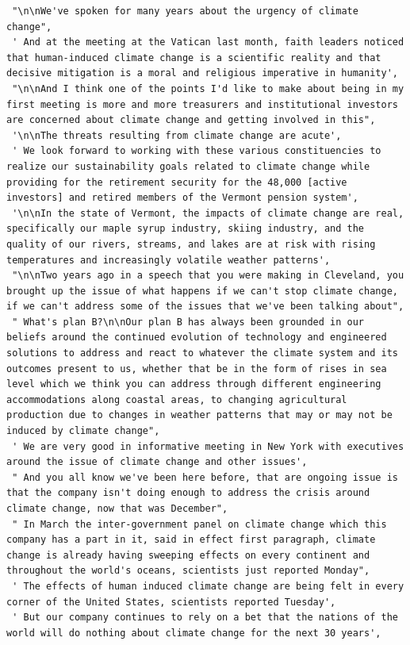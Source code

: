 \documentclass[
  letterpaper,
  DIV=11,
  numbers=noendperiod]{scrreprt}
\begin{document}
\begin{verbatim}
 "\n\nWe've spoken for many years about the urgency of climate change",
 ' And at the meeting at the Vatican last month, faith leaders noticed that human-induced climate change is a scientific reality and that decisive mitigation is a moral and religious imperative in humanity',
 "\n\nAnd I think one of the points I'd like to make about being in my first meeting is more and more treasurers and institutional investors are concerned about climate change and getting involved in this",
 '\n\nThe threats resulting from climate change are acute',
 ' We look forward to working with these various constituencies to realize our sustainability goals related to climate change while providing for the retirement security for the 48,000 [active investors] and retired members of the Vermont pension system',
 '\n\nIn the state of Vermont, the impacts of climate change are real, specifically our maple syrup industry, skiing industry, and the quality of our rivers, streams, and lakes are at risk with rising temperatures and increasingly volatile weather patterns',
 "\n\nTwo years ago in a speech that you were making in Cleveland, you brought up the issue of what happens if we can't stop climate change, if we can't address some of the issues that we've been talking about",
 " What's plan B?\n\nOur plan B has always been grounded in our beliefs around the continued evolution of technology and engineered solutions to address and react to whatever the climate system and its outcomes present to us, whether that be in the form of rises in sea level which we think you can address through different engineering accommodations along coastal areas, to changing agricultural production due to changes in weather patterns that may or may not be induced by climate change",
 ' We are very good in informative meeting in New York with executives around the issue of climate change and other issues',
 " And you all know we've been here before, that are ongoing issue is that the company isn't doing enough to address the crisis around climate change, now that was December",
 " In March the inter-government panel on climate change which this company has a part in it, said in effect first paragraph, climate change is already having sweeping effects on every continent and throughout the world's oceans, scientists just reported Monday",
 ' The effects of human induced climate change are being felt in every corner of the United States, scientists reported Tuesday',
 ' But our company continues to rely on a bet that the nations of the world will do nothing about climate change for the next 30 years',

\end{verbatim}
\end{document}
